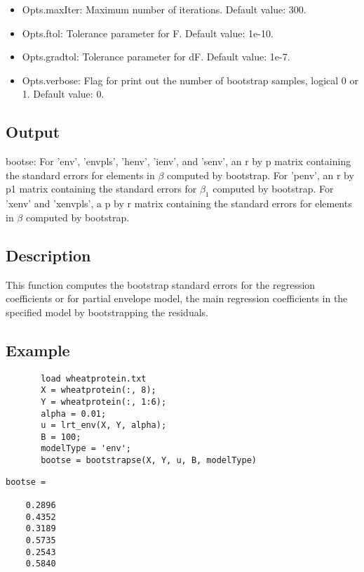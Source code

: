 \documentclass[a4paper,11pt,openany]{memoir}
\begin{document}
\begin{itemize}
\setlength{\itemsep}{-1ex}
   \item Opts.maxIter: Maximum number of iterations.  Default value: 300.
   \item Opts.ftol: Tolerance parameter for F.  Default value: 1e-10.
   \item Opts.gradtol: Tolerance parameter for dF.  Default value: 1e-7.
   \item Opts.verbose: Flag for print out the number of bootstrap samples, logical 0 or 1. Default value: 0.
\end{itemize}


\subsection*{Output}

\begin{par}
bootse: For 'env', 'envpls', 'henv', 'ienv', and 'senv', an r by p matrix containing the standard errors for elements in $\beta$ computed by bootstrap.  For 'penv', an r by p1 matrix containing the standard errors for $\beta_1$ computed by bootstrap.  For 'xenv' and 'xenvpls', a p by r matrix containing the standard errors for elements in $\beta$ computed by bootstrap.
\end{par} \vspace{1em}


\subsection*{Description}

\begin{par}
This function computes the bootstrap standard errors for the regression coefficients or for partial envelope model, the main regression coefficients in the specified model by bootstrapping the residuals.
\end{par} \vspace{1em}

\subsection*{Example}


\begin{verbatim}       load wheatprotein.txt
       X = wheatprotein(:, 8);
       Y = wheatprotein(:, 1:6);
       alpha = 0.01;
       u = lrt_env(X, Y, alpha);
       B = 100;
       modelType = 'env';
       bootse = bootstrapse(X, Y, u, B, modelType)\end{verbatim}
        \color{lightgray}\ttfamily 
        \begin{verbatim}
bootse =

    0.2896
    0.4352
    0.3189
    0.5735
    0.2543
    0.5840
\end{verbatim} 
\rmfamily
\color{black}
\end{document}
